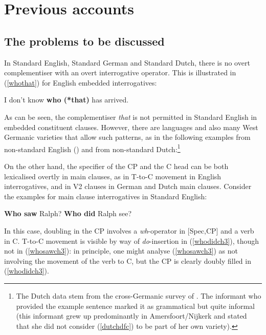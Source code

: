 \section{Previous accounts} \label{sec:3previous}
\subsection{The problems to be discussed} \label{sec:3problems}
In Standard English, Standard German and Standard Dutch, there is no overt complementiser with an overt interrogative operator. This is illustrated in (\ref{whothat}) for English embedded interrogatives:

\ea	I don't know \textbf{who (*that)} has arrived. \label{whothat}
\z

As can be seen, the complementiser \textit{that} is not permitted in Standard English in embedded constituent clauses. However, there are languages and also many West Germanic varieties that allow such patterns, as in the following examples from non-standard English (\citealt[331, ex. 1]{baltin2010}) and from non-standard Dutch:\footnote{The Dutch data stem from the cross-Germanic survey of \citet[32]{bacskaiatkaribaudisch2018}. The informant who provided the example sentence marked it as grammatical but quite informal (this informant grew up predominantly in Amersfoort/Nijkerk and stated that she did not consider (\ref{dutchdfc}) to be part of her own variety).}

\ea \label{dfcint}
\z
\z

On the other hand, the specifier of the CP and the C head can be both lexicalised overtly in main clauses, as in T-to-C movement in English interrogatives, and in V2 clauses in German and Dutch main clauses. Consider the examples for main clause interrogatives in Standard English:

\ea \label{ttoc}
\ea	\textbf{Who saw} Ralph? \label{whosawch3}
\ex	\textbf{Who did} Ralph see? \label{whodidch3}
\z
\z

In this case, doubling in the CP involves a \textit{wh}-operator in [Spec,CP] and a verb in C. T-to-C movement is visible by way of \textit{do}-insertion in (\ref{whodidch3}), though not in (\ref{whosawch3}): in principle, one might analyse (\ref{whosawch3}) as not involving the movement of the verb to C, but the CP is clearly doubly filled in (\ref{whodidch3}).

